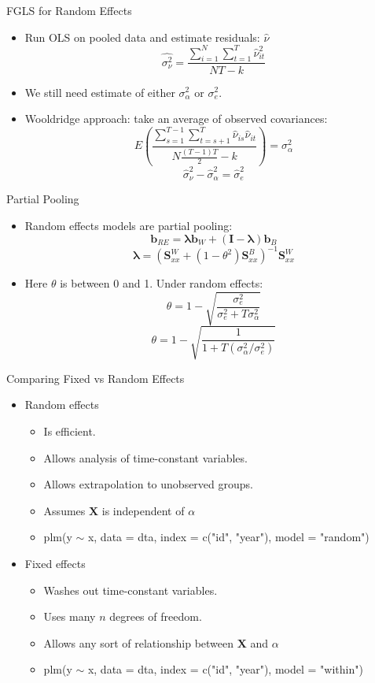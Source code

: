\documentclass[aspectratio=169, handout, t]{beamer}
\numberwithin{equation}{section}
\begin{document}
\begin{frame}{FGLS for Random Effects}
\begin{itemize}
\item Run OLS on pooled data and estimate residuals: $\hat{\nu}$
$$\widehat{\sigma^2_\nu}=\frac{\sum_{i=1}^N\sum_{t=1}^T \hat{\nu}_{it}^2}{NT-k}$$
\item We still need estimate of either $\sigma^2_\alpha$ or $\sigma^2_e$.
\item Wooldridge approach: take an average of observed covariances:
$$E\left( \frac{\sum_{s=1}^{T-1}\sum_{t=s+1}^{T}\hat{\nu}_{is}\hat{\nu}_{it}}{N\frac{(T-1)T}{2}-k}\right)=\sigma_\alpha^2$$
$$\widehat{\sigma}^2_\nu-\widehat{\sigma}_\alpha^2=\widehat{\sigma}_e^2$$
\end{itemize}
\end{frame}

\begin{frame}{Partial Pooling}
\begin{itemize}
\item Random effects models are partial pooling:
$$\bm{b}_{RE}=\bm{\lambda}\bm{b}_W+(\bm{I}-\bm{\lambda})\bm{b}_B$$
$$\bm{\lambda}=(\bm{S}^W_{xx}+(1-\theta^2)\bm{S}_{xx}^B)^{-1}\bm{S}_{xx}^W$$
\item Here $\theta$ is between 0 and 1.  Under random effects:
$$\theta=1-\sqrt{\frac{\sigma^2_e}{\sigma^2_e+T\sigma^2_\alpha}}$$
$$\theta=1-\sqrt{\frac{1}{1+T(\sigma^2_\alpha/\sigma^2_e)}}$$
\end{itemize}
\end{frame}



\begin{frame}{Comparing Fixed vs Random Effects}
\begin{itemize}
\item Random effects
\begin{itemize}
\item Is efficient.
\item Allows analysis of time-constant variables.
\item Allows extrapolation to unobserved groups.
\item Assumes $\bm{X}$ is independent of $\alpha$
\item plm(y $\sim$ x, data = dta, index = c("id", "year"), model = "random")
\end{itemize}
\item Fixed effects
\begin{itemize}
\item Washes out time-constant variables.
\item Uses many $n$ degrees of freedom.
\item Allows any sort of relationship between $\bm{X}$ and $\alpha$
\item plm(y $\sim$ x, data = dta, index = c("id", "year"), model = "within")
\end{itemize}
\end{itemize}
\end{frame}
\end{document}
